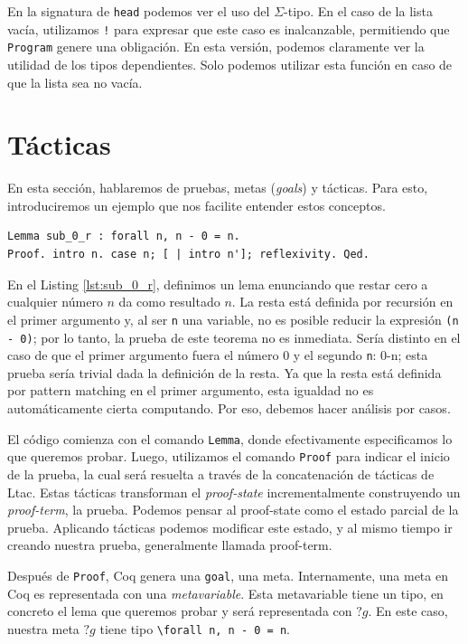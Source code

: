 En la signatura de \lstinline{head} podemos ver el uso del $\Sigma$-tipo. En el caso de la lista vacía, utilizamos \lstinline{!} para expresar que este caso es inalcanzable, permitiendo que \lstinline{Program} genere una obligación. En esta versión, podemos claramente ver la utilidad de los tipos dependientes. Solo podemos utilizar esta función en caso de que la lista sea no vacía.

\section{Tácticas}

En esta sección, hablaremos de pruebas, metas (\textit{goals}) y tácticas. Para esto, introduciremos un ejemplo que nos facilite entender estos conceptos.

\begin{lstlisting}[float=h,frame=tb,caption={Teorema y prueba en Coq},label=lst:sub_0_r]
Lemma sub_0_r : forall n, n - 0 = n.
Proof. intro n. case n; [ | intro n']; reflexivity. Qed. 
\end{lstlisting}

En el Listing \ref{lst:sub_0_r}, definimos un lema enunciando que restar cero a cualquier número $n$ da como resultado $n$.
La resta está definida por recursión en el primer argumento y, al ser \lstinline{n} una variable, no es posible reducir la expresión \lstinline{(n - 0)}; por lo tanto, la prueba de este teorema no es inmediata.
Sería distinto en el caso de que el primer argumento fuera el número 0 y el segundo \lstinline{n}: 0-n; esta prueba sería trivial dada la definición de la resta.
Ya que la resta está definida por pattern matching en el primer argumento, esta igualdad no es automáticamente cierta computando. Por eso, debemos hacer análisis por casos.

El código comienza con el comando \lstinline{Lemma}, donde efectivamente especificamos lo que queremos probar.
Luego, utilizamos el comando \lstinline{Proof} para indicar el inicio de la prueba, la cual será resuelta a través de la concatenación de tácticas de Ltac. Estas tácticas transforman el \textit{proof-state} incrementalmente construyendo un \textit{proof-term}, la prueba. Podemos pensar al proof-state como el estado parcial de la prueba. Aplicando tácticas podemos modificar este estado, y al mismo tiempo ir creando nuestra prueba, generalmente llamada proof-term.

Después de \lstinline{Proof}, Coq genera una \lstinline{goal}, una meta. Internamente, una meta en Coq es representada con una \textit{metavariable}. Esta metavariable tiene un tipo, en concreto el lema que queremos probar y será representada con $?g$. En este caso, nuestra meta $?g$ tiene tipo \lstinline{\forall n, n - 0 = n}.

